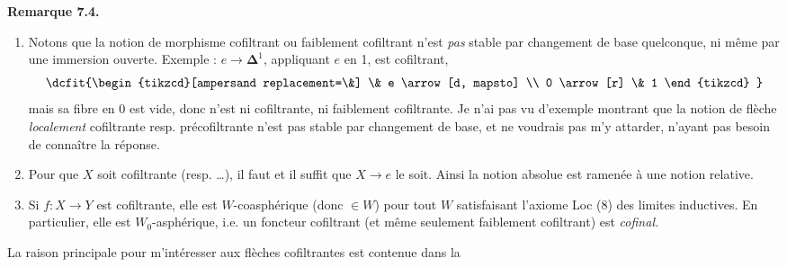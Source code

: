 \documentclass[11pt]{article}
\newcommand{\printedpage}[1]{\marginpar{\footnotesize p.~#1}}
\def\dcprintedpending{}
\newcommand{\msp}[1]{\marginpar{\footnotesize\raggedright
  \ifx\dcprintedpending\empty\else p.~\dcprintedpending\par\fi
  [#1]}\gdef\dcprintedpending{}}
\begin{document}
\printedpage{57}
\textbf{Remarque 7.4.}
\begin{enumerate}
\item[1)] Notons que la notion de morphisme cofiltrant ou faiblement cofiltrant n'est \textit{pas} stable par changement de base quelconque, ni même par une immersion ouverte. Exemple : $e \longrightarrow \boldsymbol{\Delta}^1$, appliquant $e$ en 1, est cofiltrant,
\[
\dcfit{\begin{tikzcd}[ampersand replacement=\&]
 \& e \arrow[d, mapsto] \\
0 \arrow[r] \& 1
\end{tikzcd}
}
\]
mais sa fibre en 0 est vide, donc n'est ni cofiltrante, ni faiblement cofiltrante. Je n'ai pas vu d'exemple montrant que la notion de flèche \textit{localement} cofiltrante resp. précofiltrante n'est pas stable par changement de base, et ne voudrais pas m'y attarder, n'ayant pas besoin de connaître la réponse.
\item[2)] Pour que $X$ soit cofiltrante (resp. \dots), il faut et il suffit que $X \longrightarrow e$ le soit. Ainsi la notion absolue est ramenée à une notion relative.
\item[3)] Si $f : X \longrightarrow Y$ est cofiltrante, elle est \msp{page 92} $W$-coasphérique (donc $\in W$) pour tout $W$ satisfaisant l'axiome Loc (8) des limites inductives. En particulier, elle est $W_0$-asphérique, i.e. un foncteur cofiltrant (et même seulement faiblement cofiltrant) est \textit{cofinal.}
\end{enumerate}
La raison principale pour m'intéresser aux flèches cofiltrantes est contenue dans la
\end{document}

